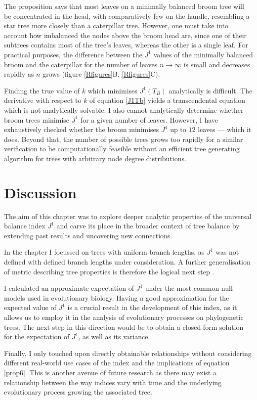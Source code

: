 The proposition says that most leaves on a minimally balanced broom tree will be
concentrated in the head, with comparatively few on the handle, resembling a
star tree more closely than a caterpillar tree. However, one must take into
account how imbalanced the nodes above the broom head are, since one of their
subtrees contains most of the tree's leaves, whereas the other is a single leaf.
For practical purposes, the difference between the $J^1$ values of the minimally
balanced broom and the caterpillar for the number of leaves $n\to\infty$ is
small and decreases rapidly as $n$ grows (figure \ref{Rfigures}B,
\ref{Rfigures}C). \par
Finding the true value of $k$ which minimises $J^1(T_B)$ analytically is
difficult. The derivative with respect to $k$ of equation \eqref{J1Tb} yields a
transcendental equation which is not analytically solvable. I also cannot
analytically determine whether broom trees minimise $J^1$ for a given number of
leaves. However, I have exhaustively checked whether the broom minimises $J^1$ up
to $12$ leaves --- which it does. Beyond that, the number of possible trees
grows too rapidly for a similar verification to be computationally feasible
without an efficient tree generating algorithm for trees with arbitrary node
degree distributions.

\section{Discussion}
The aim of this chapter was to explore deeper analytic properties of the universal
balance index $J^1$ and carve its place in the broader context of tree balance
by extending past results and uncovering new connections. \par
In the chapter I focussed on trees with uniform branch lengths, as $J^1$ was
not defined with defined branch lengths under consideration. A further
generalisation of metric describing tree properties is therefore the logical
next step \citep{noble_new_2023}. \par
I calculated an approximate expectation of $J^1$ under the most common null
models used in evolutionary biology. Having a good approximation for the
expected value of $J^1$ is a crucial result in the development of this index,
as it allows us to employ it in the analysis of evolutionary processes on
phylogenetic trees. The next step in this direction would be to obtain a
closed-form solution for the expectation of $J^1$, as well as its variance.\par
Finally, I only touched upon directly obtainable relationships without
considering different real-world use cases of the index and the implications of
equation \eqref{prop6}. This is another avenue of future research as there may
exist a relationship between the way indices vary with time and the underlying
evolutionary process growing the associated tree.

